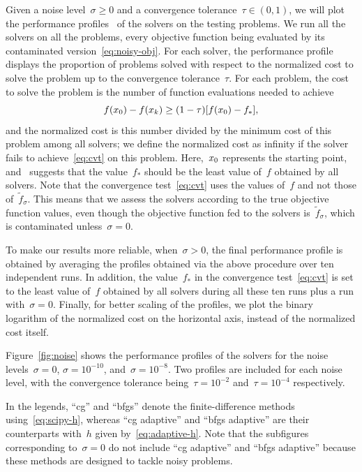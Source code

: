 \documentclass[smallextended]{svjour3}
\newcommand{\iter}[1][k]{x\ifthenelse{\equal{#1}{}}{}{_{#1}}}
\newcommand{\obj}{f}
\newcommand{\modified}[1]{#1}
\begin{document}
Given a noise level~$\sigma\ge 0$ and a convergence tolerance~$\tau\in(0,1)$, we will plot the performance profiles~\cite{More_Wild_2009} of the solvers on the testing problems.
We run all the solvers on all the problems, every objective function being evaluated by its contaminated version~\eqref{eq:noisy-obj}.
For each solver, the performance profile displays the proportion of problems solved with respect to the normalized cost to solve the problem up to the convergence tolerance~$\tau$.
For each problem, the cost to solve the problem is the number of function evaluations needed to achieve
\begin{equation}
    \label{eq:cvt}
    \obj(\iter[0]) - \obj(\iter) \ge (1 - \tau) [\obj(\iter[0]) - \obj_{\ast}],
\end{equation}
and the normalized cost is this number divided by the minimum cost of this problem among all solvers; we define the normalized cost as infinity if the solver fails to achieve~\eqref{eq:cvt} on this problem.
Here,~$\iter[0]$ represents the starting point, and~\cite[\S~2.1]{More_Wild_2009} suggests that the value~$\obj_{\ast}$ should be the least value of~$\obj$ obtained by all solvers.
Note that the convergence test~\eqref{eq:cvt} uses the values of~$\obj$ and not those of~$\tilde{\obj}_\sigma$.
This means that we assess the solvers according to the true objective function values, even though \modified{the objective function fed to the solvers is~$\tilde{\obj}_\sigma$}, which is contaminated unless~$\sigma = 0$.

To make our results more reliable, when~$\sigma>0$, the final performance profile is obtained by averaging the profiles obtained via the above procedure over ten independent runs.
In addition, the value~$\obj_{\ast}$ in the convergence test~\eqref{eq:cvt} is set to the least value of~$\obj$ obtained by all solvers during all these ten runs plus a run with~$\sigma = 0$.
Finally, for better scaling of the profiles, we plot the binary logarithm of the normalized cost on the horizontal axis, instead of the normalized cost itself.

Figure~\ref{fig:noise} shows the performance profiles of the solvers for the noise levels~$\sigma = 0$, $\sigma = 10^{-10}$, and~$\sigma = 10^{-8}$.
Two profiles are included for each noise level, with the convergence tolerance being~$\tau = 10^{-2}$ and~$\tau = 10^{-4}$ respectively.
\modified{
    In the legends, ``\gls{cg}'' and ``\gls{bfgs}'' denote the finite-difference methods using~\eqref{eq:scipy-h}, whereas ``\gls{cg} adaptive'' and ``\gls{bfgs} adaptive'' are their counterparts with~$h$ given by~\eqref{eq:adaptive-h}.
    Note that the subfigures corresponding to~$\sigma = 0$ do not include ``\gls{cg} adaptive'' and ``\gls{bfgs} adaptive'' because these methods are designed to tackle noisy problems.
}
\end{document}

